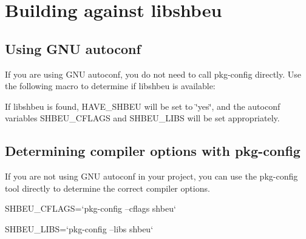 \section{Building against libshbeu}
\label{group__building}
\subsection{Using GNU autoconf}\label{group__building_autoconf}
If you are using GNU autoconf, you do not need to call pkg-\/config directly. Use the following macro to determine if libshbeu is available:




If libshbeu is found, HAVE\_\-SHBEU will be set to \char`\"{}yes\char`\"{}, and the autoconf variables SHBEU\_\-CFLAGS and SHBEU\_\-LIBS will be set appropriately.\subsection{Determining compiler options with pkg-\/config}\label{group__building_pkg-config}
If you are not using GNU autoconf in your project, you can use the pkg-\/config tool directly to determine the correct compiler options.


\begin{DoxyPre}
 SHBEU\_CFLAGS=`pkg-config --cflags shbeu`\end{DoxyPre}



\begin{DoxyPre} SHBEU\_LIBS=`pkg-config --libs shbeu`
 \end{DoxyPre}
 